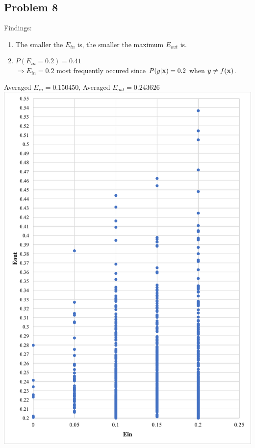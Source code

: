 \documentclass[12pt, a4paper]{article}
\begin{document}
\begin{CJK}{UTF8}{bkai}
	\section*{Problem 8}
		Findings: 
		\begin{enumerate}
		\item 
			The smaller the $E_{in}$ is, the smaller the maximum $E_{out}$ is.
		\item 
			$P(E_{in}=0.2) = 0.41$\\
			$\Rightarrow E_{in} = 0.2$ most frequently occured since $P(y|{\bf x}) = 0.2$ when $y \neq f({\bf x})$.
		\end{enumerate}
		Averaged $E_{in} = 0.150450$, Averaged $E_{out} = 0.243626$\\
		\includegraphics[width=17cm, keepaspectratio=true]{8.png} \par
	

\end{CJK}
\end{document}
